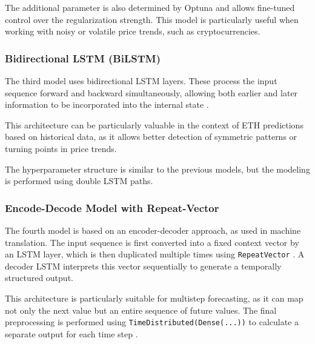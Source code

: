 The additional parameter is also determined by Optuna and allows fine-tuned control over the regularization strength.
This model is particularly useful when working with noisy or volatile price trends, such as cryptocurrencies.



\subsubsection{Bidirectional LSTM (BiLSTM)}

The third model uses bidirectional LSTM layers.
These process the input sequence forward and backward simultaneously, allowing both earlier and later information to be incorporated into the internal state \cite{bi-lstm}.

This architecture can be particularly valuable in the context of ETH predictions based on historical data, as it allows better detection of symmetric patterns or turning points in price trends.

The hyperparameter structure is similar to the previous models, but the modeling is performed using double LSTM paths.



\subsubsection{Encode-Decode Model with Repeat-Vector}

The fourth model is based on an encoder-decoder approach, as used in machine translation.
The input sequence is first converted into a fixed context vector by an LSTM layer, which is then duplicated multiple times using \texttt{RepeatVector} \cite{keras-repeat-vector}.
A decoder LSTM interprets this vector sequentially to generate a temporally structured output.

This architecture is particularly suitable for multistep forecasting, as it can map not only the next value but an entire sequence of future values.
The final preprocessing is performed using \texttt{TimeDistributed(Dense(...))} to calculate a separate output for each time step \cite{keras-time-distributed}.



